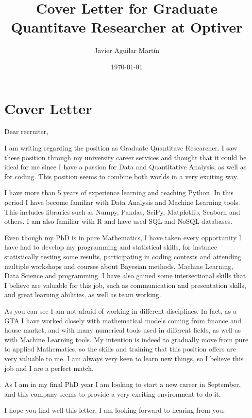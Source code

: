 \documentclass{article}
\theoremstyle{plain}
\theoremstyle{definition}
\begin{document}
\title{Cover Letter for Graduate Quantitave Researcher at Optiver}
\author{Javier Aguilar Martín}
\date{\today}
\maketitle
\section{Cover Letter}

Dear recruiter,

I am writing regarding the position as Graduate Quantitave Researcher. I saw these position through my university career services and thought that it could be ideal for me since I have a passion for Data and Quantitative Analysis, as well as for coding. This position seems to combine both worlds in a very exciting way.

I have more than 5 years of experience learning and teaching Python. In this period I have become familiar with Data Analysis and Machine Learning tools. This includes libraries such as Numpy, Pandas, SciPy, Matplotlib, Seaborn and others. I am also familiar with R and have used SQL and NoSQL databases. 

Even though my PhD is in pure Mathematics, I have taken every opportunity I have had to develop my programming and statistical skills, for instance statistically testing some results, participating in coding contests and attending multiple workshops and courses about Bayesian methods, Machine Learning, Data Science and programming. I have also gained some intersectional skills that I believe are valuable for this job, such as communication and presentation skills, and great learning abilities, as well as team working.

As you can see I am not afraid of working in different disciplines. In fact, as a GTA I have worked closely with mathematical models coming from finance and house market, and with many numerical tools used in different fields, as well as with Machine Learning tools. My intention is indeed to gradually move from pure to applied Mathematics, so the skills and training that this position offers are very valuable to me. I am always very keen to learn new things, so I believe this job and I are a perfect match.

As I am in my final PhD year I am looking to start a new career in September, and this company seems to provide a very exciting environment to do it.

I hope you find well this letter, I am looking forward to hearing from you.
\end{document}
